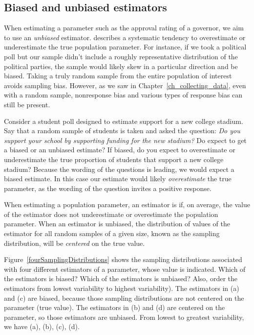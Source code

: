 \subsection{Biased and unbiased estimators}
When estimating a parameter such as the approval rating of a governor, we aim to use an \emph{unbiased} estimator.  describes a systematic tendency
to overestimate or underestimate the true population parameter.
 For instance, if we took a political poll but our sample
  didn't include a roughly representative distribution of
  the political parties, the sample would likely skew
  in a particular direction and be biased.  Taking a truly random sample from the entire population of interest avoids sampling bias.  However, as we saw in Chapter~\ref{ch_collecting_data}, even with a random sample, nonresponse bias and various types of response bias can still be present.  


\begin{examplewrap}
\begin{nexample}{
Consider a student poll designed to estimate support for a new college stadium.  Say that a random sample of students is taken and asked the question: \emph{Do you support your school by supporting funding
  for the new stadium?} Do expect to get a biased or an unbiased estimate?  If biased, do you expect to overestimate or underestimate the true proportion of students that support a new college stadium? }
Because the wording of the questions is leading, we would expect a biased estimate.   In this case our estimate would likely \emph{overestimate} the true parameter, as the wording of the question invites a positive response.
\end{nexample}
\end{examplewrap}

When estimating a population parameter, an estimator is  if, on
average, the value of the estimator does not underestimate or overestimate the
population parameter.  When an estimator is unbiased, the distribution of values of the estimator for all random samples of a given size, known as the sampling distribution, will be \emph{centered} on the true value.  


\begin{examplewrap}
\begin{nexample}
{Figure~\ref{fourSamplingDistributions} shows the sampling distributions associated with four different estimators of a parameter, whose value is indicated.  Which of the estimators is biased?  Which of the estimators is unbiased?  Also, order the estimators from lowest variability to highest variability).}
The estimators in (a) and (c) are biased, because those sampling distributions are not centered on the parameter (true value).  The estimators in (b) and (d) are centered on the parameter, so those estimators are unbiased.  From lowest to greatest variability, we have (a), (b), (c), (d).
\end{nexample}
\end{examplewrap}

